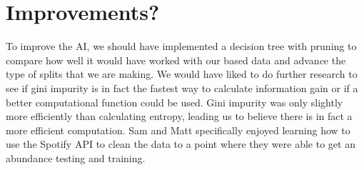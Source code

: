 \documentclass[]{report}
\begin{document}
	\section{Improvements?}
	To improve the AI, we should have implemented a decision tree with pruning to compare how well it would have worked with our based data and advance the type of splits that we are making. We would have liked to do further research to see if gini impurity is in fact the fastest way to calculate information gain or if a better computational function could be used. Gini impurity was only slightly more efficiently than calculating entropy, leading us to believe there is in fact a more efficient computation. Sam and Matt specifically enjoyed learning how to use the Spotify API to clean the data to a point where they were able to get an abundance testing and training.
\end{document}
